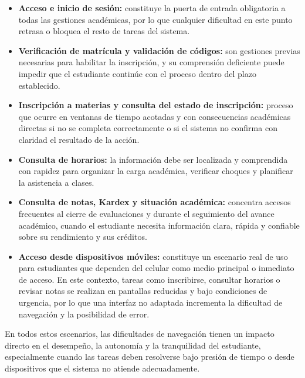         \begin{itemize}

            \item \textbf{Acceso e inicio de sesión:} constituye la puerta de entrada obligatoria a todas las gestiones académicas, por lo que cualquier dificultad en este punto retrasa o bloquea el resto de tareas del sistema.

            \item \textbf{Verificación de matrícula y validación de códigos:} son gestiones previas necesarias para habilitar la inscripción, y su comprensión deficiente puede impedir que el estudiante continúe con el proceso dentro del plazo establecido.

            \item \textbf{Inscripción a materias y consulta del estado de inscripción:} proceso que ocurre en ventanas de tiempo acotadas y con consecuencias académicas directas si no se completa correctamente o si el sistema no confirma con claridad el resultado de la acción.

            \item \textbf{Consulta de horarios:} la información debe ser localizada y comprendida con rapidez para organizar la carga académica, verificar choques y planificar la asistencia a clases.

            \item \textbf{Consulta de notas, Kardex y situación académica:} concentra accesos frecuentes al cierre de evaluaciones y durante el seguimiento del avance académico, cuando el estudiante necesita información clara, rápida y confiable sobre su rendimiento y sus créditos.

            \item \textbf{Acceso desde dispositivos móviles:} constituye un escenario real de uso para estudiantes que dependen del celular como medio principal o inmediato de acceso. En este contexto, tareas como inscribirse, consultar horarios o revisar notas se realizan en pantallas reducidas y bajo condiciones de urgencia, por lo que una interfaz no adaptada incrementa la dificultad de navegación y la posibilidad de error.
            
        \end{itemize}

    En todos estos escenarios, las dificultades de navegación tienen un impacto directo en el desempeño, la autonomía y la tranquilidad del estudiante, especialmente cuando las tareas deben resolverse bajo presión de tiempo o desde dispositivos que el sistema no atiende adecuadamente.

